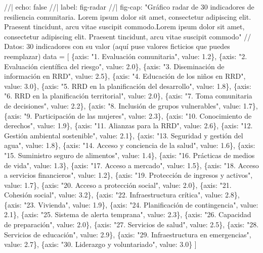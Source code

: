 \documentclass[
  letterpaper,
]{book}
\newenvironment{Shaded}{\begin{snugshade}}{\end{snugshade}}
\newcommand{\NormalTok}[1]{\textcolor[rgb]{0.00,0.23,0.31}{#1}}
\begin{document}
\begin{Shaded}
\begin{Highlighting}[]
\NormalTok{//| echo: false}
\NormalTok{//| label: fig{-}radar}
\NormalTok{//| fig{-}cap: "Gráfico radar de 30 indicadores de resiliencia comunitaria. Lorem ipsum dolor sit amet, consectetur adipiscing elit. Praesent tincidunt, arcu vitae suscipit commodo.Lorem ipsum dolor sit amet, consectetur adipiscing elit. Praesent tincidunt, arcu vitae suscipit commodo"}
\NormalTok{// Datos: 30 indicadores con su valor (aquí puse valores ficticios que puedes reemplazar)}
\NormalTok{data = [}
\NormalTok{  \{axis: "1. Evaluación comunitaria", value: 1.2\},}
\NormalTok{  \{axis: "2. Evaluación científica del riesgo", value: 2.0\},}
\NormalTok{  \{axis: "3. Diseminación de información en RRD", value: 2.5\},}
\NormalTok{  \{axis: "4. Educación de los niños en RRD", value: 3.0\},}
\NormalTok{  \{axis: "5. RRD en la planificación del desarrollo", value: 1.8\},}
\NormalTok{  \{axis: "6. RRD en la planificación territorial", value: 2.0\},}
\NormalTok{  \{axis: "7. Toma comunitaria de decisiones", value: 2.2\},}
\NormalTok{  \{axis: "8. Inclusión de grupos vulnerables", value: 1.7\},}
\NormalTok{  \{axis: "9. Participación de las mujeres", value: 2.3\},}
\NormalTok{  \{axis: "10. Conocimiento de derechos", value: 1.9\},}
\NormalTok{  \{axis: "11. Alianzas para la RRD", value: 2.6\},}
\NormalTok{  \{axis: "12. Gestión ambiental sostenible", value: 2.1\},}
\NormalTok{  \{axis: "13. Seguridad y gestión del agua", value: 1.8\},}
\NormalTok{  \{axis: "14. Acceso y conciencia de la salud", value: 1.6\},}
\NormalTok{  \{axis: "15. Suministro seguro de alimentos", value: 1.4\},}
\NormalTok{  \{axis: "16. Prácticas de medios de vida", value: 1.3\},}
\NormalTok{  \{axis: "17. Acceso a mercado", value: 1.5\},}
\NormalTok{  \{axis: "18. Acceso a servicios financieros", value: 1.2\},}
\NormalTok{  \{axis: "19. Protección de ingresos y activos", value: 1.7\},}
\NormalTok{  \{axis: "20. Acceso a protección social", value: 2.0\},}
\NormalTok{  \{axis: "21. Cohesión social", value: 3.2\},}
\NormalTok{  \{axis: "22. Infraestructura crítica", value: 2.8\},}
\NormalTok{  \{axis: "23. Vivienda", value: 1.9\},}
\NormalTok{  \{axis: "24. Planificación de contingencia", value: 2.1\},}
\NormalTok{  \{axis: "25. Sistema de alerta temprana", value: 2.3\},}
\NormalTok{  \{axis: "26. Capacidad de preparación", value: 2.0\},}
\NormalTok{  \{axis: "27. Servicios de salud", value: 2.5\},}
\NormalTok{  \{axis: "28. Servicios de educación", value: 2.9\},}
\NormalTok{  \{axis: "29. Infraestructura en emergencias", value: 2.7\},}
\NormalTok{  \{axis: "30. Liderazgo y voluntariado", value: 3.0\}}
\NormalTok{]}


\end{Highlighting}
\end{Shaded}
\end{document}
